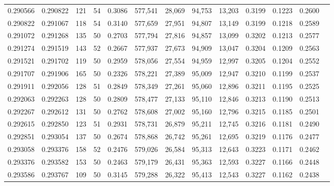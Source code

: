 \begin{tabular}{rrrrrrrrrrrrr}
0.290566 & 0.290822 &   121 &  54 &                                     0.3086 & 577,541 &  28,069 &  94,753 &  13,203 & 0.3199 & 0.1223 & 0.2600 \\
0.290822 & 0.291067 &   118 &  54 &                                     0.3140 & 577,659 &  27,951 &  94,807 &  13,149 & 0.3199 & 0.1218 & 0.2589 \\
0.291072 & 0.291268 &   135 &  50 &                                     0.2703 & 577,794 &  27,816 &  94,857 &  13,099 & 0.3202 & 0.1213 & 0.2577 \\
0.291274 & 0.291519 &   143 &  52 &                                     0.2667 & 577,937 &  27,673 &  94,909 &  13,047 & 0.3204 & 0.1209 & 0.2563 \\
0.291521 & 0.291702 &   119 &  50 &                                     0.2959 & 578,056 &  27,554 &  94,959 &  12,997 & 0.3205 & 0.1204 & 0.2552 \\
0.291707 & 0.291906 &   165 &  50 &                                     0.2326 & 578,221 &  27,389 &  95,009 &  12,947 & 0.3210 & 0.1199 & 0.2537 \\
0.291911 & 0.292056 &   128 &  51 &                                     0.2849 & 578,349 &  27,261 &  95,060 &  12,896 & 0.3211 & 0.1195 & 0.2525 \\
0.292063 & 0.292263 &   128 &  50 &                                     0.2809 & 578,477 &  27,133 &  95,110 &  12,846 & 0.3213 & 0.1190 & 0.2513 \\
0.292267 & 0.292612 &   131 &  50 &                                     0.2762 & 578,608 &  27,002 &  95,160 &  12,796 & 0.3215 & 0.1185 & 0.2501 \\
0.292615 & 0.292850 &   123 &  51 &                                     0.2931 & 578,731 &  26,879 &  95,211 &  12,745 & 0.3216 & 0.1181 & 0.2490 \\
0.292851 & 0.293054 &   137 &  50 &                                     0.2674 & 578,868 &  26,742 &  95,261 &  12,695 & 0.3219 & 0.1176 & 0.2477 \\
0.293058 & 0.293376 &   158 &  52 &                                     0.2476 & 579,026 &  26,584 &  95,313 &  12,643 & 0.3223 & 0.1171 & 0.2462 \\
0.293376 & 0.293582 &   153 &  50 &                                     0.2463 & 579,179 &  26,431 &  95,363 &  12,593 & 0.3227 & 0.1166 & 0.2448 \\
0.293586 & 0.293767 &   109 &  50 &                                     0.3145 & 579,288 &  26,322 &  95,413 &  12,543 & 0.3227 & 0.1162 & 0.2438 \\

\end{tabular}
